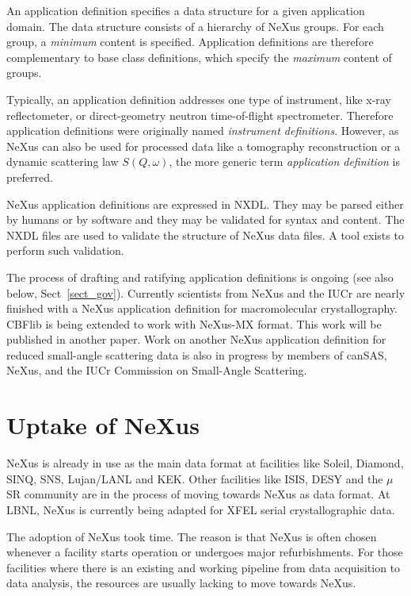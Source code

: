 \documentclass[%
 aip,
rsi,
 amsmath,amssymb,
 reprint,%
]{revtex4-1}
\begin{document}
An application definition specifies a data structure
for a given application domain.
The data structure consists of a hierarchy of NeXus groups.
For each group, a \emph{minimum} content is specified.
Application definitions are therefore complementary
to base class definitions, which specify the \emph{maximum} content of groups.

Typically, an application definition addresses one type of instrument,
like x-ray reflectometer,
or direct-geometry neutron time-of-flight spectrometer.
Therefore application definitions were originally named \emph{instrument definitions}.
However, as NeXus can also be used for processed data
like a tomography reconstruction or a dynamic scattering law $S(Q,\omega)$, 
the more generic term \emph{application definition} is preferred.

NeXus application definitions are expressed in NXDL.  They may be parsed either by humans or by software and 
they may be validated for syntax and content.  The NXDL files are used to validate the structure of
NeXus data files. A tool exists to perform such validation.%

The process of drafting and ratifying application definitions
is ongoing (see also below, Sect~\ref{sect_gov}).
Currently scientists 
from NeXus and the IUCr are nearly finished with a NeXus application definition for macromolecular crystallography.
CBFlib\cite{cbflib} is being extended to work with NeXus-MX format. This work will be published in another paper. 
Work on another NeXus application definition for reduced small-angle scattering data
is also in progress\cite{cansas}  by members of 
canSAS, NeXus, and the IUCr Commission on Small-Angle Scattering.


\section{Uptake of NeXus} 

NeXus is already in use as the main data format at facilities like Soleil, Diamond, SINQ, SNS, Lujan/LANL 
and KEK. Other facilities like ISIS, DESY and the $\mu$SR community are in the process of moving towards 
NeXus as  data format. At LBNL, NeXus is currently being adapted for XFEL serial crystallographic data. 


The adoption of NeXus took time. The reason is that NeXus is often chosen whenever 
a facility starts operation or undergoes major refurbishments. For those facilities where there is an existing and working 
pipeline from data acquisition to data analysis,  the resources are usually lacking to move 
towards NeXus.
\end{document}
